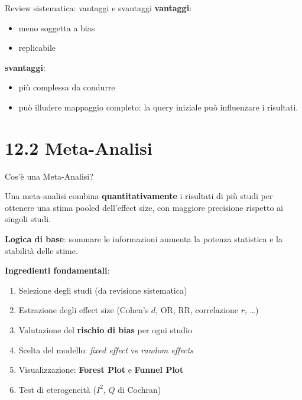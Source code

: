 \documentclass[
  ignorenonframetext,
]{beamer}
\providecommand{\tightlist}{%
  \setlength{\itemsep}{0pt}\setlength{\parskip}{0pt}}
\begin{document}
\begin{frame}{Review sistematica: vantaggi e svantaggi}
\label{review-sistematica-vantaggi-e-svantaggi}
\textbf{vantaggi}:

\begin{itemize}
\tightlist
\item
  meno soggetta a bias
\item
  replicabile
\end{itemize}

\textbf{svantaggi}:

\begin{itemize}
\tightlist
\item
  più complessa da condurre
\item
  può illudere mappaggio completo: la query iniziale può influenzare i
  risultati.
\end{itemize}
\end{frame}

\section{12.2 Meta-Analisi}\label{meta-analisi}

\begin{frame}{Cos'è una Meta-Analisi?}
\label{cosuxe8-una-meta-analisi}
\small

Una meta-analisi combina \textbf{quantitativamente} i risultati di più
studi per ottenere una stima pooled dell'effect size, con maggiore
precisione rispetto ai singoli studi.

\vspace{0.4em}

\textbf{Logica di base}: sommare le informazioni aumenta la potenza
statistica e la stabilità delle stime.

\vspace{0.4em}

\textbf{Ingredienti fondamentali}:

\begin{enumerate}\footnotesize
\item Selezione degli studi (da revisione sistematica)
\item Estrazione degli effect size (Cohen's $d$, OR, RR, correlazione $r$, \ldots)
\item Valutazione del \textbf{rischio di bias} per ogni studio
\item Scelta del modello: \emph{fixed effect} vs \emph{random effects}
\item Visualizzazione: \textbf{Forest Plot} e \textbf{Funnel Plot}
\item Test di eterogeneità ($I^2$, $Q$ di Cochran)
\end{enumerate}
\end{frame}
\end{document}
